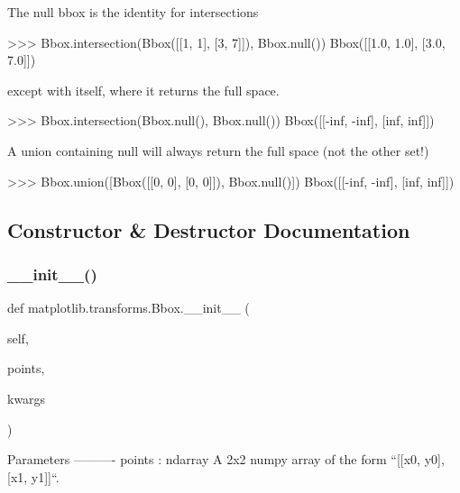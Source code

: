 \begin{DoxyVerb}
The null bbox is the identity for intersections

    >>> Bbox.intersection(Bbox([[1, 1], [3, 7]]), Bbox.null())
    Bbox([[1.0, 1.0], [3.0, 7.0]])

except with itself, where it returns the full space.

    >>> Bbox.intersection(Bbox.null(), Bbox.null())
    Bbox([[-inf, -inf], [inf, inf]])

A union containing null will always return the full space (not the other
set!)

    >>> Bbox.union([Bbox([[0, 0], [0, 0]]), Bbox.null()])
    Bbox([[-inf, -inf], [inf, inf]])
\end{DoxyVerb}
 

\subsection{Constructor \& Destructor Documentation}
\mbox{\label{classmatplotlib_1_1transforms_1_1Bbox_a4d30c401a865a35a1e30520f5f65120b}} 
\subsubsection{\texorpdfstring{\+\_\+\+\_\+init\+\_\+\+\_\+()}{\_\_init\_\_()}\hspace{0.1cm}{\footnotesize\ttfamily [1/2]}}
{\footnotesize\ttfamily def matplotlib.\+transforms.\+Bbox.\+\_\+\+\_\+init\+\_\+\+\_\+ (\begin{DoxyParamCaption}\item[{}]{self,  }\item[{}]{points,  }\item[{}]{kwargs }\end{DoxyParamCaption})}

\begin{DoxyVerb}Parameters
----------
points : ndarray
    A 2x2 numpy array of the form ``[[x0, y0], [x1, y1]]``.
\end{DoxyVerb}
 \mbox{\label{classmatplotlib_1_1transforms_1_1Bbox_a4d30c401a865a35a1e30520f5f65120b}} 
